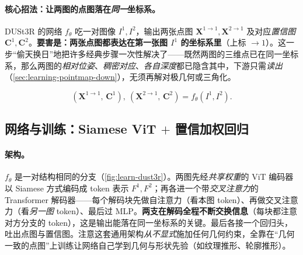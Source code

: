 \paragraph{核心招法：让两图的点图落在\emph{同一}坐标系。}
DUSt3R 的网络 $f_\theta$ 吃一对图像 $I^1,I^2$，输出两张点图 $\mathbf{X}^{1\to1},\mathbf{X}^{2\to1}$ 及对应\emph{置信图} $\mathbf{C}^{1},\mathbf{C}^{2}$\cite{wang2024dust3r}。\textbf{要害是：两张点图都表达在第一张图 $I^1$ 的坐标系里}（上标 $\to1$）。这一步“偷天换日”地把许多经典步骤一次性解决了——既然两图的三维点已在同一坐标系，那么两图的\emph{相对位姿}、\emph{稠密对应}、\emph{各自深度}都已隐含其中，下游只需\emph{读出}（\cref{sec:learning-pointmap-down}），无须再解对极几何或三角化。

\begin{equation}
  (\mathbf{X}^{1\to1},\,\mathbf{C}^{1}),\ (\mathbf{X}^{2\to1},\,\mathbf{C}^{2})=f_\theta(I^1,I^2).
  \label{eq:learn-pointmap}
\end{equation}

\subsection{网络与训练：Siamese ViT \texorpdfstring{$+$}{+} 置信加权回归}
\label{sec:learning-pointmap-net}

\paragraph{架构。}
$f_\theta$ 是一对结构相同的分支（\cref{fig:learn-dust3r}）。两图先经\emph{共享权重}的 ViT 编码器以 Siamese 方式编码成 token 表示 $F^1,F^2$；再各进一个带\emph{交叉注意力}的 Transformer 解码器——每个解码块先做自注意力（看本图 token）、再做交叉注意力（看\emph{另一图} token）、最后过 MLP。\textbf{两支在解码全程不断交换信息}（每块都注意对方分支的 token），这是输出能落在同一坐标系的关键。最后各接一个回归头，吐出点图与置信图。注意这套通用架构\emph{从不显式}施加任何几何约束，全靠在“几何一致的点图”上训练让网络自己学到几何与形状先验（如纹理推形、轮廓推形）。

